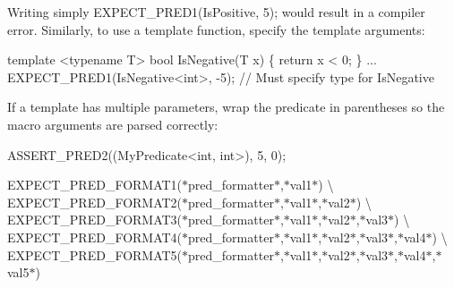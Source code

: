 Writing simply {\ttfamily E\+X\+P\+E\+C\+T\+\_\+\+P\+R\+E\+D1(\+Is\+Positive, 5);} would result in a compiler error. Similarly, to use a template function, specify the template arguments\+:


\begin{DoxyCode}
\textcolor{keyword}{template} <\textcolor{keyword}{typename} T>
\textcolor{keywordtype}{bool} IsNegative(T x) \{
  \textcolor{keywordflow}{return} x < 0;
\}
...
EXPECT\_PRED1(IsNegative<int>, -5);  \textcolor{comment}{// Must specify type for IsNegative}
\end{DoxyCode}


If a template has multiple parameters, wrap the predicate in parentheses so the macro arguments are parsed correctly\+:


\begin{DoxyCode}
ASSERT\_PRED2((MyPredicate<int, int>), 5, 0);
\end{DoxyCode}


{\ttfamily E\+X\+P\+E\+C\+T\+\_\+\+P\+R\+E\+D\+\_\+\+F\+O\+R\+M\+A\+T1(}$\ast${\ttfamily pred\+\_\+formatter}$\ast${\ttfamily ,}$\ast${\ttfamily val1}$\ast${\ttfamily )} \textbackslash{} {\ttfamily E\+X\+P\+E\+C\+T\+\_\+\+P\+R\+E\+D\+\_\+\+F\+O\+R\+M\+A\+T2(}$\ast${\ttfamily pred\+\_\+formatter}$\ast${\ttfamily ,}$\ast${\ttfamily val1}$\ast${\ttfamily ,}$\ast${\ttfamily val2}$\ast${\ttfamily )} \textbackslash{} {\ttfamily E\+X\+P\+E\+C\+T\+\_\+\+P\+R\+E\+D\+\_\+\+F\+O\+R\+M\+A\+T3(}$\ast${\ttfamily pred\+\_\+formatter}$\ast${\ttfamily ,}$\ast${\ttfamily val1}$\ast${\ttfamily ,}$\ast${\ttfamily val2}$\ast${\ttfamily ,}$\ast${\ttfamily val3}$\ast${\ttfamily )} \textbackslash{} {\ttfamily E\+X\+P\+E\+C\+T\+\_\+\+P\+R\+E\+D\+\_\+\+F\+O\+R\+M\+A\+T4(}$\ast${\ttfamily pred\+\_\+formatter}$\ast${\ttfamily ,}$\ast${\ttfamily val1}$\ast${\ttfamily ,}$\ast${\ttfamily val2}$\ast${\ttfamily ,}$\ast${\ttfamily val3}$\ast${\ttfamily ,}$\ast${\ttfamily val4}$\ast${\ttfamily )} \textbackslash{} {\ttfamily E\+X\+P\+E\+C\+T\+\_\+\+P\+R\+E\+D\+\_\+\+F\+O\+R\+M\+A\+T5(}$\ast${\ttfamily pred\+\_\+formatter}$\ast${\ttfamily ,}$\ast${\ttfamily val1}$\ast${\ttfamily ,}$\ast${\ttfamily val2}$\ast${\ttfamily ,}$\ast${\ttfamily val3}$\ast${\ttfamily ,}$\ast${\ttfamily val4}$\ast${\ttfamily ,}$\ast${\ttfamily val5}$\ast${\ttfamily )}

